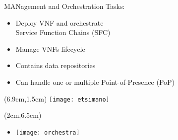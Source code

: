 \begin{frame}{MANagement and Orchestration}
  Tasks:
  \begin{itemize}
  \item<1-> Deploy VNF and orchestrate\\ Service Function Chains (SFC)
  \item<2-> Manage VNFs lifecycle
  \item<3-> Contains data repositories
  \item<4-> Can handle one or multiple Point-of-Presence (PoP)
  \end{itemize}

  \begin{textblock*}{5cm}(6.9cm,1.5cm)
    \texttt{[image: etsimano]}
  \end{textblock*}

  \begin{textblock*}{5cm}(2cm,6.5cm)
    \begin{itemize}
    \item[] \texttt{[image: orchestra]}
    \end{itemize}
  \end{textblock*}
\end{frame}
